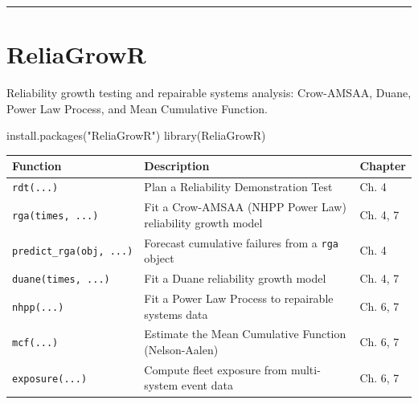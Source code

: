 \documentclass[
  letterpaper,
  DIV=11,
  numbers=noendperiod]{scrreprt}
\newenvironment{Shaded}{\begin{snugshade}}{\end{snugshade}}
\newcommand{\FunctionTok}[1]{\textcolor[rgb]{0.28,0.35,0.67}{#1}}
\newcommand{\NormalTok}[1]{\textcolor[rgb]{0.00,0.23,0.31}{#1}}
\newcommand{\StringTok}[1]{\textcolor[rgb]{0.13,0.47,0.30}{#1}}
\newcounter{none} %
\begin{document}
\begin{center}\rule{0.5\linewidth}{0.5pt}\end{center}

\section*{ReliaGrowR}\label{reliagrowr}


Reliability growth testing and repairable systems analysis: Crow-AMSAA,
Duane, Power Law Process, and Mean Cumulative Function.

\begin{Shaded}
\begin{Highlighting}[]
\FunctionTok{install.packages}\NormalTok{(}\StringTok{"ReliaGrowR"}\NormalTok{)}
\FunctionTok{library}\NormalTok{(ReliaGrowR)}
\end{Highlighting}
\end{Shaded}

{\def\LTcaptype{none} %
\begin{longtable}[]{@{}
  >{\raggedright\arraybackslash}p{}
  >{\raggedright\arraybackslash}p{}
  >{\raggedright\arraybackslash}p{}@{}}
\toprule\noalign{}
\begin{minipage}[b]{\linewidth}\raggedright
Function
\end{minipage} & \begin{minipage}[b]{\linewidth}\raggedright
Description
\end{minipage} & \begin{minipage}[b]{\linewidth}\raggedright
Chapter
\end{minipage} \\
\midrule\noalign{}
\endhead
\bottomrule\noalign{}
\endlastfoot
\texttt{rdt(...)} & Plan a Reliability Demonstration Test & Ch. 4 \\
\texttt{rga(times,\ ...)} & Fit a Crow-AMSAA (NHPP Power Law)
reliability growth model & Ch. 4, 7 \\
\texttt{predict\_rga(obj,\ ...)} & Forecast cumulative failures from a
\texttt{rga} object & Ch. 4 \\
\texttt{duane(times,\ ...)} & Fit a Duane reliability growth model & Ch.
4, 7 \\
\texttt{nhpp(...)} & Fit a Power Law Process to repairable systems data
& Ch. 6, 7 \\
\texttt{mcf(...)} & Estimate the Mean Cumulative Function (Nelson-Aalen)
& Ch. 6, 7 \\
\texttt{exposure(...)} & Compute fleet exposure from multi-system event
data & Ch. 6, 7 \\
\end{longtable}
}
\end{document}
